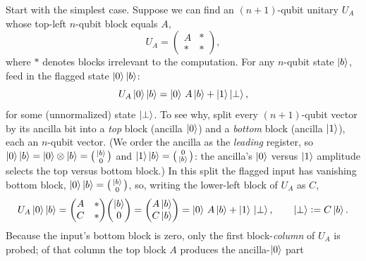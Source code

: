 Start with the simplest case. Suppose we can find an $(n+1)$-qubit unitary $U_A$
whose top-left $n$-qubit block equals $A$,
\begin{equation}
  U_A=\begin{pmatrix} A & \ast\\ \ast & \ast\end{pmatrix},
  \label{eq:lec06-block1}
\end{equation}
where $\ast$ denotes blocks irrelevant to the computation. For any $n$-qubit state
$\ket{b}$, feed in the flagged state $\ket{0}\ket{b}$:
\begin{equation}
  U_A\ket{0}\ket{b}=\ket{0}\,A\ket{b}+\ket{1}\ket{\perp},
  \label{eq:lec06-apply1}
\end{equation}
for some (unnormalized) state $\ket{\perp}$. To see why, split every $(n+1)$-qubit
vector by its ancilla bit into a \emph{top} block (ancilla $\ket0$) and a
\emph{bottom} block (ancilla $\ket1$), each an $n$-qubit vector. (We order the ancilla
as the \emph{leading} register, so $\ket0\ket b=\ket0\otimes\ket b
=\left(\begin{smallmatrix}\ket b\\ 0\end{smallmatrix}\right)$ and
$\ket1\ket b=\left(\begin{smallmatrix}0\\ \ket b\end{smallmatrix}\right)$: the
ancilla's $\ket0$ versus $\ket1$ amplitude selects the top versus bottom block.) In
this split the flagged input has vanishing bottom block,
$\ket{0}\ket{b}=\left(\begin{smallmatrix}\ket b\\ 0\end{smallmatrix}\right)$, so,
writing the lower-left block of $U_A$ as $C$,
\[
  U_A\ket{0}\ket{b}
   =\begin{pmatrix}A&\ast\\ C&\ast\end{pmatrix}\!
    \begin{pmatrix}\ket b\\ 0\end{pmatrix}
   =\begin{pmatrix}A\ket b\\ C\ket b\end{pmatrix}
   =\ket{0}\,A\ket{b}+\ket{1}\,\ket{\perp},
   \qquad \ket{\perp}\vcentcolon= C\ket{b}.
\]
Because the input's bottom block is zero, only the first block-\emph{column} of
$U_A$ is probed; of that column the top block $A$ produces the ancilla-$\ket0$ part
